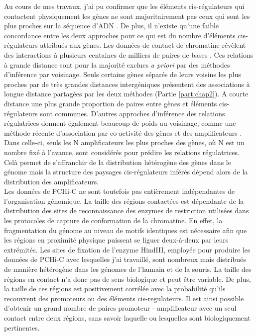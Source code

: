 Au cours de mes travaux, j’ai pu confirmer que les éléments \gls{cis}-régulateurs qui contactent physiquement les gènes ne sont majoritairement pas ceux qui sont les plus proches sur la séquence d’ADN \citep{smemo_obesity-associated_2014}. De plus, il n’existe qu’une faible concordance entre les deux approches pour ce qui est du nombre d’éléments \gls{cis}-régulateurs attribués aux gènes. Les données de contact de chromatine révèlent des interactions à plusieurs centaines de milliers de paires de bases \citep{laverre_long-range_2022}. Ces relations à grande distance sont pour la majorité exclues \textit{a priori} par des méthodes d’inférence par voisinage. Seuls certains gènes séparés de leurs voisins les plus proches par de très grandes distances intergéniques présentent des associations à longue distance partagées par les deux méthodes (Partie \ref{part:chap2}). A courte distance une plus grande proportion de paires entre gènes et éléments \gls{cis}-régulateurs sont communes. D’autres approches d'inférence des relations régulatrices donnent également beaucoup de poids au voisinage, comme une méthode récente d’association par co-activité des gènes et des \glspl{amplificateur} \citep{hait_ct-focs_2022}. Dans celle-ci, seuls les N \glspl{amplificateur} les plus proches des gènes, où N est un nombre fixé à l'avance, sont considérés pour prédire les relations régulatrices. Celà permet de s’affranchir de la distribution hétérogène des gènes dans le génome mais la structure des paysages \gls{cis}-régulateurs inférés dépend alors de la distribution des amplificateurs.\\

Les données de \acrshort{PCHi-C} ne sont toutefois pas entièrement indépendantes de l’organisation génomique. La taille des régions contactées est dépendante de la distribution des sites de reconnaissance des enzymes de restriction utilisées dans les protocoles de capture de conformation de la chromatine. En effet, la fragmentation du génome au niveau de motifs identiques est nécessaire afin que les régions en proximité physique puissent se liguer deux-à-deux par leurs extrémités. Les sites de fixation de l’enzyme HindIII, employée pour produire les données de \acrshort{PCHi-C} avec lesquelles j’ai travaillé, sont nombreux mais distribués de manière hétérogène dans les génomes de l’humain et de la souris. La taille des régions en contact n’a donc pas de sens biologique et peut être variable. De plus, la taille de ces régions est positivement corrélée avec la probabilité qu'ils recouvrent des promoteurs ou des éléments \gls{cis}-regulateurs. Il est ainsi possible d’obtenir un grand nombre de paires promoteur - \gls{amplificateur} avec un seul contact entre deux régions, sans savoir laquelle ou lesquelles sont biologiquement pertinentes. 

